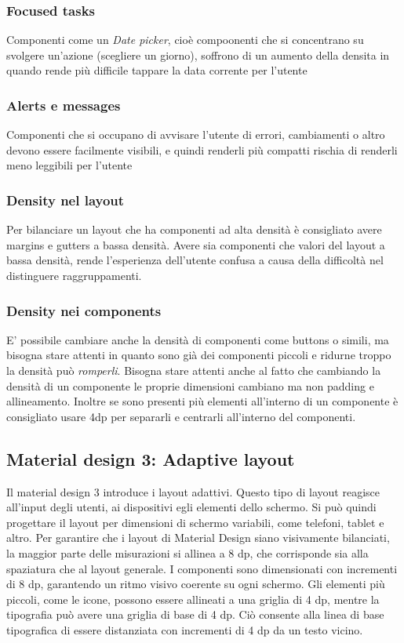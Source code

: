 \documentclass[12pt, a4paper]{report}
\begin{document}
		  \subsubsection{Focused tasks}
		  Componenti come un \textit{Date picker}, cioè compoonenti che si concentrano su svolgere un'azione (scegliere un giorno), soffrono di un aumento della densita in quando rende più difficile tappare la data corrente per l'utente
		  \subsubsection{Alerts e messages}
		  Componenti che si occupano di avvisare l'utente di errori, cambiamenti o altro devono essere facilmente visibili, e quindi renderli più compatti rischia di renderli meno leggibili per l'utente 

		  \subsubsection{Density nel layout}
		  Per bilanciare un layout che ha componenti ad alta densità è consigliato avere margins e gutters a bassa densità.
		  Avere sia componenti che valori del layout a bassa densità, rende l'esperienza dell'utente confusa a causa della difficoltà nel distinguere raggruppamenti.
		  \subsubsection{Density nei components}
		  	 E' possibile cambiare anche la densità di componenti come buttons o simili, ma bisogna stare attenti in quanto sono già dei componenti piccoli e ridurne troppo la densità può \textit{romperli}.
			Bisogna stare attenti anche al fatto che cambiando la densità di un componente le proprie dimensioni cambiano ma non padding e allineamento.
			Inoltre se sono presenti più elementi all'interno di un componente è consigliato usare 4dp per separarli e centrarli all'interno del componenti.

	\subsection{Material design 3: Adaptive layout}
	Il material design 3 introduce i layout adattivi. Questo tipo di layout reagisce all'input degli utenti, ai dispositivi egli elementi dello schermo. Si può quindi progettare il layout per dimensioni di schermo variabili, come telefoni, tablet e altro.
	Per garantire che i layout di Material Design siano visivamente bilanciati, la maggior parte delle misurazioni si allinea a 8 dp, che corrisponde sia alla spaziatura che al layout generale. I componenti sono dimensionati con incrementi di 8 dp, garantendo un ritmo visivo coerente su ogni schermo.
	Gli elementi più piccoli, come le icone, possono essere allineati a una griglia di 4 dp, mentre la tipografia può avere una griglia di base di 4 dp. Ciò consente alla linea di base tipografica di essere distanziata con incrementi di 4 dp da un testo vicino.
\end{document}
